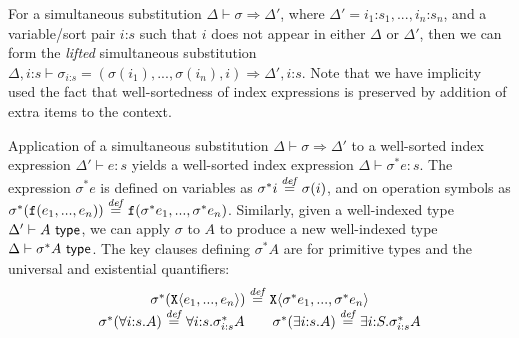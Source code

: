 For a simultaneous substitution $\Delta \vdash \sigma \Rightarrow
\Delta'$, where $\Delta' = i_1\mathord:s_1,...,i_n\mathord:s_n$, and a
variable/sort pair $i\mathord:s$ such that $i$ does not appear in
either $\Delta$ or $\Delta'$, then we can form the \emph{lifted}
simultaneous substitution $\Delta,i\mathord:s \vdash
\sigma_{i\mathord:s} = (\sigma(i_1), ..., \sigma(i_n), i) \Rightarrow
\Delta',i\mathord:s$. Note that we have implicity used the fact that
well-sortedness of index expressions is preserved by addition of extra
items to the context.

Application of a simultaneous substitution $\Delta \vdash \sigma
\Rightarrow \Delta'$ to a well-sorted index expression $\Delta' \vdash
e : s$ yields a well-sorted index expression $\Delta \vdash \sigma^*e
: s$. The expression $\sigma^*e$ is defined on variables as $\sigma^*i
\stackrel{\mathit{def}}= \sigma(i)$, and on operation symbols as
$\sigma^*(\texttt{f}(e_1,...,e_n)) \stackrel{\mathit{def}}=
\texttt{f}(\sigma^*e_1, ..., \sigma^*e_n)$.  Similarly, given a
well-indexed type $\Delta' \vdash A \textsf{ type}$, we can apply $\sigma$ to
$A$ to produce a new well-indexed type $\Delta \vdash \sigma^*A
\textsf{ type}$. The key clauses defining $\sigma^*A$ are for primitive types
and the universal and existential quantifiers:
\begin{displaymath}
  \begin{array}{c}
    \sigma^*(\tyPrim{X}{e_1,...,e_n}) \isDefinedAs \tyPrim{X}{\sigma^*e_1,...,\sigma^*e_n}
    \\
    \begin{array}{c@{\hspace{2em}}c}
      \sigma^*(\forall i\mathord:s.A) \isDefinedAs \forall i\mathord:s.\sigma_{i\mathord:s}^*A
      &
      \sigma^*(\exists i\mathord:s.A) \isDefinedAs \exists i\mathord:S. \sigma_{i\mathord:s}^*A
    \end{array}
  \end{array}
\end{displaymath}

